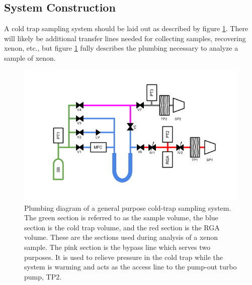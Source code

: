 \documentclass[12pt]{article}
\begin{document}
\subsection{System Construction}
A cold trap sampling system should be laid out as described by figure \ref{fig:CTpid}. There will likely be additional transfer lines needed for collecting samples, recovering xenon, etc., but figure \ref{fig:CTpid} fully describes the plumbing necessary to analyze a sample of xenon.

\begin{figure}[h]
  \includegraphics[width=\linewidth]{Figures/ColdTrap_diagram.png}
  \caption{Plumbing diagram of a general purpose cold-trap sampling system. The green section is referred to as the sample volume, the blue section is the cold trap volume, and the red section is the RGA volume. These are the sections used during analysis of a xenon sample. The pink section is the bypass line which serves two purposes. It is used to relieve pressure in the cold trap while the system is warming and acts as the access line to the pump-out turbo pump, TP2. }
  \label{fig:CTpid}
\end{figure}
\end{document}
